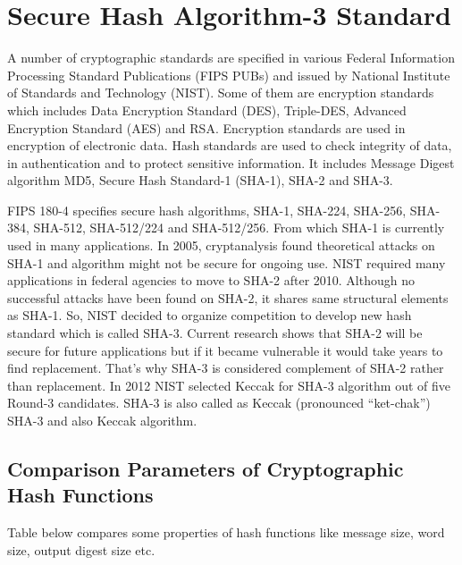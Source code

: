 \chapter{Secure Hash Algorithm-3 Standard}

A number of cryptographic standards are specified in various Federal Information Processing Standard Publications (FIPS PUBs) and issued by National Institute of Standards and Technology (NIST). Some of them are encryption standards which includes Data Encryption Standard (DES), Triple-DES, Advanced Encryption Standard (AES) and RSA. Encryption standards are used in encryption of electronic data. Hash standards are used to check integrity of data, in authentication and to protect sensitive information. It includes Message Digest algorithm MD5, Secure Hash Standard-1 (SHA-1), SHA-2 and SHA-3. \par

FIPS 180-4 specifies secure hash algorithms, SHA-1, SHA-224, SHA-256, SHA-384, SHA-512, SHA-512/224 and SHA-512/256. From which SHA-1 is currently used in many applications. In 2005, cryptanalysis found theoretical attacks on SHA-1 and algorithm might not be secure for ongoing use. NIST required many applications in federal agencies to move to SHA-2 after 2010. Although no successful attacks have been found on SHA-2, it shares same structural elements as SHA-1. So, NIST decided to organize competition to develop new hash standard which is called SHA-3. Current research shows that SHA-2 will be secure for future applications but if it became vulnerable it would take years to find replacement. That’s why SHA-3 is considered complement of SHA-2 rather than replacement\cite{insha3}. In 2012 NIST selected Keccak for SHA-3 algorithm out of five Round-3 candidates. SHA-3 is also called as Keccak (pronounced “ket-chak”) SHA-3 and also Keccak algorithm.

\section{Comparison Parameters of Cryptographic Hash Functions}

Table below compares some properties of hash functions \cite{shs} like message size, word size, output digest size etc.

